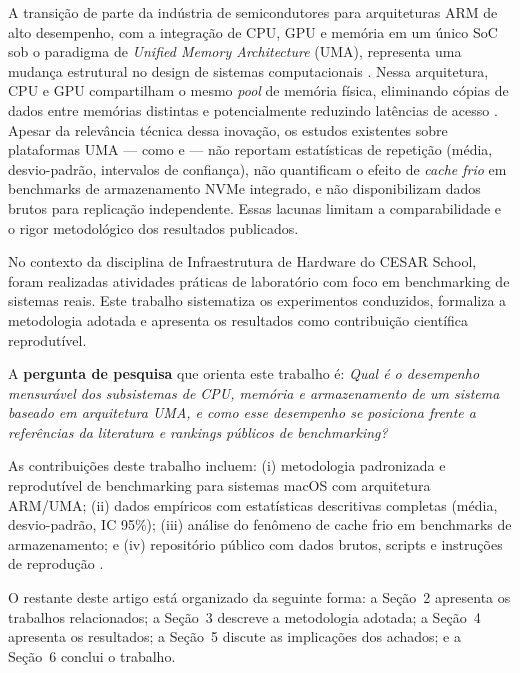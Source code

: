 \documentclass[12pt]{article}
\begin{document}
A transi\c{c}\~ao de parte da ind\'ustria de semicondutores para arquiteturas
ARM de alto desempenho, com a integra\c{c}\~ao de CPU, GPU e mem\'oria em um
\'unico SoC sob o paradigma de \textit{Unified Memory Architecture} (UMA),
representa uma mudan\c{c}a estrutural no design de sistemas computacionais
\cite{hennessy2017computer}. Nessa arquitetura, CPU e GPU compartilham o mesmo
\textit{pool} de mem\'oria f\'isica, eliminando c\'opias de dados entre
mem\'orias distintas e potencialmente reduzindo lat\^encias de acesso
\cite{lim2022apple}. Apesar da relev\^ancia t\'ecnica dessa inova\c{c}\~ao,
os estudos existentes sobre plataformas UMA --- como \cite{lim2022apple} e
\cite{truong2022performance} --- n\~ao reportam estat\'isticas de repeti\c{c}\~ao
(m\'edia, desvio-padr\~ao, intervalos de confian\c{c}a), n\~ao quantificam o
efeito de \textit{cache frio} em benchmarks de armazenamento NVMe integrado,
e n\~ao disponibilizam dados brutos para replica\c{c}\~ao independente.
Essas lacunas limitam a comparabilidade e o rigor metodol\'ogico dos
resultados publicados.

No contexto da disciplina de Infraestrutura de Hardware do CESAR School, foram
realizadas atividades pr\'aticas de laborat\'orio com foco em benchmarking de
sistemas reais. Este trabalho sistematiza os experimentos conduzidos,
formaliza a metodologia adotada e apresenta os resultados como contribui\c{c}\~ao
cient\'ifica reprodut\'ivel.

A \textbf{pergunta de pesquisa} que orienta este trabalho \'e: \textit{Qual
\'e o desempenho mensur\'avel dos subsistemas de CPU, mem\'oria e armazenamento
de um sistema baseado em arquitetura UMA, e como esse desempenho se posiciona
frente a refer\^encias da literatura e rankings p\'ublicos de benchmarking?}

As contribui\c{c}\~oes deste trabalho incluem: (i) metodologia padronizada e
reprodut\'ivel de benchmarking para sistemas macOS com arquitetura ARM/UMA;
(ii) dados emp\'iricos com estat\'isticas descritivas completas (m\'edia,
desvio-padr\~ao, IC 95\%); (iii) an\'alise do fen\^omeno de cache frio em
benchmarks de armazenamento; e (iv) reposit\'orio p\'ublico com dados brutos,
scripts e instru\c{c}\~oes de reprodu\c{c}\~ao \cite{github2025repo}.

O restante deste artigo est\'a organizado da seguinte forma: a Se\c{c}\~ao~2
apresenta os trabalhos relacionados; a Se\c{c}\~ao~3 descreve a metodologia
adotada; a Se\c{c}\~ao~4 apresenta os resultados; a Se\c{c}\~ao~5 discute as
implica\c{c}\~oes dos achados; e a Se\c{c}\~ao~6 conclui o trabalho.
\end{document}
